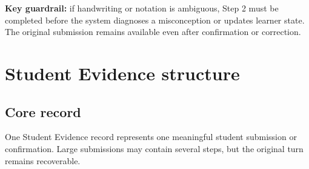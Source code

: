 \documentclass[11pt]{article}
\begin{document}
\noindent\textbf{Key guardrail:} if handwriting or notation is ambiguous, Step 2 must be completed before the system diagnoses a misconception or updates learner state. The original submission remains available even after confirmation or correction.
\clearpage

\section{Student Evidence structure}

\subsection{Core record}

One Student Evidence record represents one meaningful student submission or confirmation. Large submissions may contain several steps, but the original turn remains recoverable.
\end{document}
